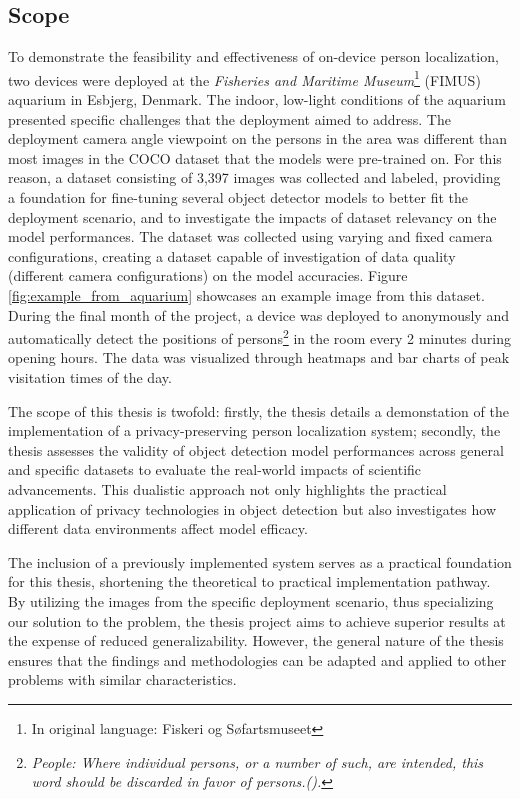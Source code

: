 \subsection{Scope}
\label{sec:scope}
To demonstrate the feasibility and effectiveness of on-device person localization, two devices were deployed at the \textit{Fisheries and Maritime Museum}\footnote{In original language: Fiskeri og Søfartsmuseet} (FIMUS) aquarium in Esbjerg, Denmark. The indoor, low-light conditions of the aquarium presented specific challenges that the deployment aimed to address. The deployment camera angle viewpoint on the persons in the area was different than most images in the COCO dataset that the models were pre-trained on. For this reason, a dataset consisting of 3,397 images was collected and labeled, providing a foundation for fine-tuning several object detector models to better fit the deployment scenario, and to investigate the impacts of dataset relevancy on the model performances. The dataset was collected using varying and fixed camera configurations, creating a dataset capable of investigation of data quality (different camera configurations) on the model accuracies. Figure \ref{fig:example_from_aquarium} showcases an example image from this dataset. During the final month of the project, a device was deployed to anonymously and automatically detect the positions of persons\footnote{\textit{People: Where individual persons, or a number of such, are intended, this word should be discarded in favor of persons.(\cite{vizetelly2015deskbook}).}} in the room every 2 minutes during opening hours. The data was visualized through heatmaps and bar charts of peak visitation times of the day. 

The scope of this thesis is twofold: firstly, the thesis details a demonstation of the implementation of a privacy-preserving person localization system; secondly, the thesis assesses the validity of object detection model performances across general and specific datasets to evaluate the real-world impacts of scientific advancements. This dualistic approach not only highlights the practical application of privacy technologies in object detection but also investigates how different data environments affect model efficacy.

The inclusion of a previously implemented system serves as a practical foundation for this thesis, shortening the theoretical to practical implementation pathway. By utilizing the images from the specific deployment scenario, thus specializing our solution to the problem, the thesis project aims to achieve superior results at the expense of reduced generalizability. However, the general nature of the thesis ensures that the findings and methodologies can be adapted and applied to other problems with similar characteristics.

